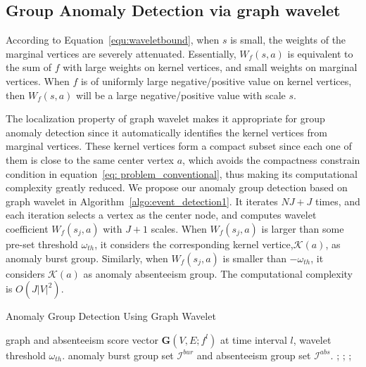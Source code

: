\subsection{Group Anomaly Detection via graph wavelet}
\label{sec:Group_Anomaly_Detection_via_graph_wavelet}
According to Equation~\ref{equ:waveletbound}, when $s$ is small, the weights of the marginal vertices are severely attenuated.
Essentially, $W_f(s,a)$ is equivalent to the sum of $f$ with large weights on kernel vertices, and small weights on marginal vertices.
When $f$ is of uniformly large negative/positive value on kernel vertices, then $W_f(s,a)$ will be a large negative/positive value with scale $s$.

The localization property of graph wavelet makes it appropriate for group anomaly detection since it automatically identifies the kernel vertices from marginal vertices. These kernel vertices form a compact subset since each one of them is close to the same center vertex $a$, which avoids the compactness constrain condition in equation~\ref{eq: problem_conventional}, thus making its computational complexity greatly reduced. We propose our anomaly group detection based on graph wavelet in Algorithm~\ref{algo:event_detection1}. It iterates $NJ+J$ times, and each iteration selects a vertex as the center node, and computes wavelet coefficient $W_f(s_j, a)$ with $J+1$ scales. When $W_f(s_j, a)$ is larger than some pre-set threshold $\omega_{th}$, it considers the corresponding kernel vertice,$\mathcal{K}(a)$, as anomaly burst group. Similarly, when $W_f(s_j, a)$ is smaller than $-\omega_{th}$, it considers $\mathcal{K}(a)$ as anomaly absenteeism group. The computational complexity is $O(J|V|^2)$.

\begin{algorithm}[ht]
\centering
\captionsetup{font=scriptsize}
\caption{Anomaly Group Detection Using Graph Wavelet}
{\footnotesize \begin{algorithmic}[1]
 graph and absenteeism score vector $\mathbf{G}(V,E;f^l)$ at time interval $l$, wavelet threshold $\omega_{th}$.
 anomaly burst group set $\mathcal{I}^{bur}$ and absenteeism group set $\mathcal{I}^{abs}$.	
;
;
	    ;
	    \ENDIF
	
	    \ENDIF	
	
\ENDFOR	
{}
\end{algorithmic}}
\label{algo:event_detection1}
\end{algorithm}


